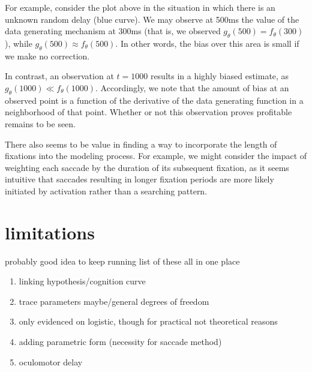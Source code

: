 \documentclass{article}
\begin{document}
For example, consider the plot above in the situation in which there is an unknown random delay (blue curve). We may observe at 500ms the value of the data generating mechanism at 300ms (that is, we observed $g_{\theta}(500) = f_{\theta}(300)$), while $g_{\theta}(500) \approx f_{\theta}(500)$. In other words, the bias over this area is small if we make no correction.

In contrast, an observation at $t = 1000$ results in a highly biased estimate, as $g_{\theta}(1000) \ll f_{\theta}(1000)$. Accordingly, we note that the amount of bias at an observed point is a function of the derivative of the data generating function in a neighborhood of that point. Whether or not this observation proves profitable remains to be seen.

There also seems to be value in finding a way to incorporate the length of fixations into the modeling process. For example, we might consider the impact of weighting each saccade by the duration of its subsequent fixation, as it seems intuitive that saccades resulting in longer fixation periods are more likely initiated by activation rather than a searching pattern.

\section{limitations}

probably good idea to keep running list of these all in one place

\begin{enumerate}
\item linking hypothesis/cognition curve
\item trace parameters maybe/general degrees of freedom
\item only evidenced on logistic, though for practical not theoretical reasons
\item adding parametric form (necessity for saccade method)
\item oculomotor delay
\end{enumerate}

\end{document}
